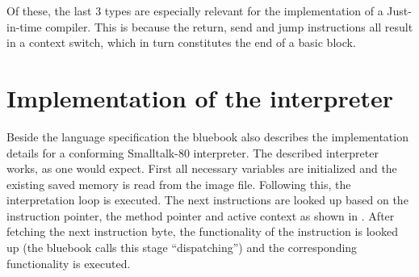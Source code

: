 Of these, the last 3 types are especially relevant for the implementation of a Just-in-time compiler. 
This is because the return, send and jump instructions all result in a context switch, which in turn constitutes the end of a basic block.

\section{Implementation of the interpreter}
Beside the language specification the bluebook also describes the implementation details for a conforming Smalltalk-80 interpreter. 
The described interpreter works, as one would expect. First all necessary variables are initialized and the existing saved memory is read from the image file.
Following this, the interpretation loop is executed. The next instructions are looked up based on the instruction pointer, the method pointer and active context as shown in .
After fetching the next instruction byte, the functionality of the instruction is looked up (the bluebook calls this stage \enquote{dispatching}) and the corresponding functionality is executed.
